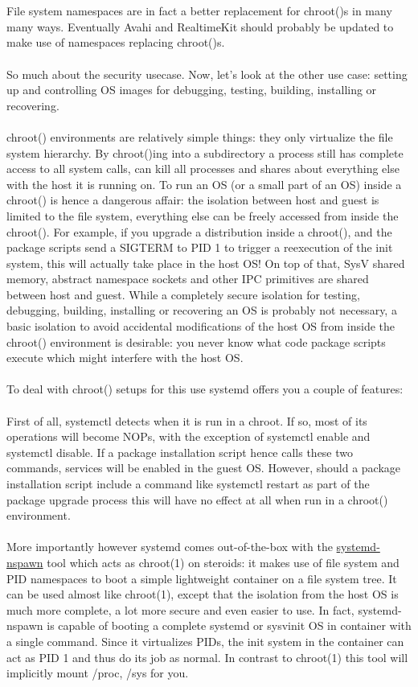 \documentclass[titlepage]{article}
\begin{document}
\\
\\
File system namespaces are in fact a better replacement for chroot()s in many many ways. Eventually Avahi and RealtimeKit should probably be updated to make use of namespaces replacing chroot()s.
\\
\\
So much about the security usecase. Now, let's look at the other use case: setting up and controlling OS images for debugging, testing, building, installing or recovering.
\\
\\
chroot() environments are relatively simple things: they only virtualize the file system hierarchy. By chroot()ing into a subdirectory a process still has complete access to all system calls, can kill all processes and shares about everything else with the host it is running on. To run an OS (or a small part of an OS) inside a chroot() is hence a dangerous affair: the isolation between host and guest is limited to the file system, everything else can be freely accessed from inside the chroot(). For example, if you upgrade a distribution inside a chroot(), and the package scripts send a SIGTERM to PID 1 to trigger a reexecution of the init system, this will actually take place in the host OS! On top of that, SysV shared memory, abstract namespace sockets and other IPC primitives are shared between host and guest. While a completely secure isolation for testing, debugging, building, installing or recovering an OS is probably not necessary, a basic isolation to avoid accidental modifications of the host OS from inside the chroot() environment is desirable: you never know what code package scripts execute which might interfere with the host OS.
\\
\\
To deal with chroot() setups for this use systemd offers you a couple of features:
\\
\\
First of all, systemctl detects when it is run in a chroot. If so, most of its operations will become NOPs, with the exception of systemctl enable and systemctl disable. If a package installation script hence calls these two commands, services will be enabled in the guest OS. However, should a package installation script include a command like systemctl restart as part of the package upgrade process this will have no effect at all when run in a chroot() environment.
\\
\\
More importantly however systemd comes out-of-the-box with the \href{https://0pointer.de/public/systemd-man/systemd-nspawn.html}{systemd-nspawn} tool which acts as chroot(1) on steroids: it makes use of file system and PID namespaces to boot a simple lightweight container on a file system tree. It can be used almost like chroot(1), except that the isolation from the host OS is much more complete, a lot more secure and even easier to use. In fact, systemd-nspawn is capable of booting a complete systemd or sysvinit OS in container with a single command. Since it virtualizes PIDs, the init system in the container can act as PID 1 and thus do its job as normal. In contrast to chroot(1) this tool will implicitly mount /proc, /sys for you.
\end{document}
